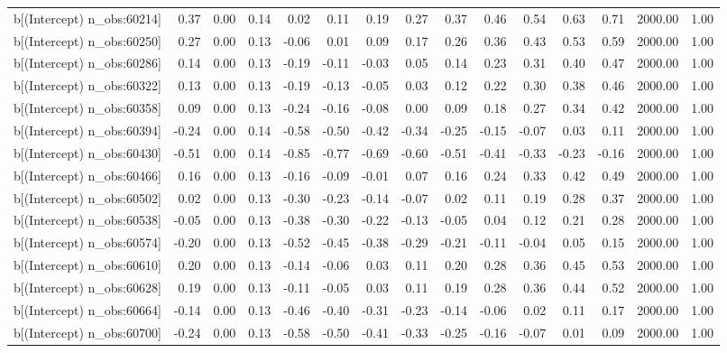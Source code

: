 \begin{table}[ht]
\begin{tabular}{rrrrrrrrrrrrrrr}
  b[(Intercept) n\_obs:60214] & 0.37 & 0.00 & 0.14 & 0.02 & 0.11 & 0.19 & 0.27 & 0.37 & 0.46 & 0.54 & 0.63 & 0.71 & 2000.00 & 1.00 \\ 
  b[(Intercept) n\_obs:60250] & 0.27 & 0.00 & 0.13 & -0.06 & 0.01 & 0.09 & 0.17 & 0.26 & 0.36 & 0.43 & 0.53 & 0.59 & 2000.00 & 1.00 \\ 
  b[(Intercept) n\_obs:60286] & 0.14 & 0.00 & 0.13 & -0.19 & -0.11 & -0.03 & 0.05 & 0.14 & 0.23 & 0.31 & 0.40 & 0.47 & 2000.00 & 1.00 \\ 
  b[(Intercept) n\_obs:60322] & 0.13 & 0.00 & 0.13 & -0.19 & -0.13 & -0.05 & 0.03 & 0.12 & 0.22 & 0.30 & 0.38 & 0.46 & 2000.00 & 1.00 \\ 
  b[(Intercept) n\_obs:60358] & 0.09 & 0.00 & 0.13 & -0.24 & -0.16 & -0.08 & 0.00 & 0.09 & 0.18 & 0.27 & 0.34 & 0.42 & 2000.00 & 1.00 \\ 
  b[(Intercept) n\_obs:60394] & -0.24 & 0.00 & 0.14 & -0.58 & -0.50 & -0.42 & -0.34 & -0.25 & -0.15 & -0.07 & 0.03 & 0.11 & 2000.00 & 1.00 \\ 
  b[(Intercept) n\_obs:60430] & -0.51 & 0.00 & 0.14 & -0.85 & -0.77 & -0.69 & -0.60 & -0.51 & -0.41 & -0.33 & -0.23 & -0.16 & 2000.00 & 1.00 \\ 
  b[(Intercept) n\_obs:60466] & 0.16 & 0.00 & 0.13 & -0.16 & -0.09 & -0.01 & 0.07 & 0.16 & 0.24 & 0.33 & 0.42 & 0.49 & 2000.00 & 1.00 \\ 
  b[(Intercept) n\_obs:60502] & 0.02 & 0.00 & 0.13 & -0.30 & -0.23 & -0.14 & -0.07 & 0.02 & 0.11 & 0.19 & 0.28 & 0.37 & 2000.00 & 1.00 \\ 
  b[(Intercept) n\_obs:60538] & -0.05 & 0.00 & 0.13 & -0.38 & -0.30 & -0.22 & -0.13 & -0.05 & 0.04 & 0.12 & 0.21 & 0.28 & 2000.00 & 1.00 \\ 
  b[(Intercept) n\_obs:60574] & -0.20 & 0.00 & 0.13 & -0.52 & -0.45 & -0.38 & -0.29 & -0.21 & -0.11 & -0.04 & 0.05 & 0.15 & 2000.00 & 1.00 \\ 
  b[(Intercept) n\_obs:60610] & 0.20 & 0.00 & 0.13 & -0.14 & -0.06 & 0.03 & 0.11 & 0.20 & 0.28 & 0.36 & 0.45 & 0.53 & 2000.00 & 1.00 \\ 
  b[(Intercept) n\_obs:60628] & 0.19 & 0.00 & 0.13 & -0.11 & -0.05 & 0.03 & 0.11 & 0.19 & 0.28 & 0.36 & 0.44 & 0.52 & 2000.00 & 1.00 \\ 
  b[(Intercept) n\_obs:60664] & -0.14 & 0.00 & 0.13 & -0.46 & -0.40 & -0.31 & -0.23 & -0.14 & -0.06 & 0.02 & 0.11 & 0.17 & 2000.00 & 1.00 \\ 
  b[(Intercept) n\_obs:60700] & -0.24 & 0.00 & 0.13 & -0.58 & -0.50 & -0.41 & -0.33 & -0.25 & -0.16 & -0.07 & 0.01 & 0.09 & 2000.00 & 1.00 \\ 

\end{tabular}
\end{table}
